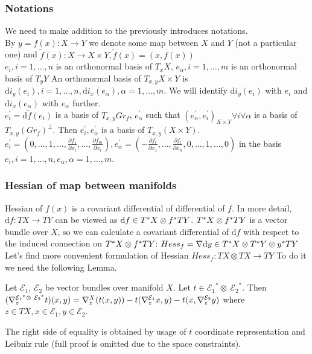 \documentclass{llncs}
\newcommand{\partderiv}[2]{\frac{\partial #1}{\partial #2}}
\newcommand{\CovariantDerivManif}[2]{\tensor*{\nabla}{^{#1}_{#2}}}
\newcommand{\CovariantDiff}{\nabla}
\newcommand{\Diff}{\mathrm{d}}
\newcommand{\TangentBundle}[1]{T{#1}}
\newcommand{\CotangentBundle}[1]{\tensor*{T}{^{*}}{#1}}
\newcommand {\Preimage}[2]{{#2}^*{#1}}
\newcommand \TPreimage[2]{\Preimage{\TangentBundle{#1}}{#2}}
\newcommand {\DiffSpace}[3]{\CotangentBundle{#1}\otimes \TPreimage{#2}{#3}}
\newcommand {\HessianSpace}[3]{\CotangentBundle{#1}\otimes \CotangentBundle{#2}\otimes \TPreimage{#2}{#3}}
\newcommand {\bigeps}{\mathcal{E}}
\begin{document}
\subsubsection{Notations}
We need to make addition to the previously introduces notations.
\\
By $y = f(x):X\to Y$ we denote some map between $X$ and $Y$ (not a particular one) and $\tilde{f}(x):X \to X\times Y, \tilde{f}(x)=(x,f(x))$
\\
${e_i, i=1, …,n}$ is an orthonormal basis of $T_x X$, ${e_\alpha, i=1, …,m}$ is an orthonormal basis of $T_y Y$
An orthonormal basis of $T_{x,y} X\times Y$ is ${\Diff i_y(e_i), i=1,\dots,n, \Diff i_x(e_\alpha),\alpha=1,\dots,m}$. We will identify $\Diff i_y(e_i)$ with $e_i$ and $\Diff i_x(e_\alpha)$ with $e_\alpha$ further. 
\\
$e_i^{'}=\Diff \tilde{f}(e_i)$ is a basis of $T_{x, y} Gr_f$, 
$e_\alpha^{'}$ such that $(e_\alpha^{'},e_i^{'})_{X\times Y} \forall i \forall \alpha$ is a basis of $T_{x, y} (Gr_f)^{\bot}$. Then $e_i^{'}, e_\alpha^{'}$ is a basis of $T_{x,y}(X\times Y)$. $e_i^{'} = (0,\dots,1, \dots, \partderiv{f_1}{x_i}, \dots, \partderiv{f_m}{x_i}), 
e_{\alpha}^{'}=(-\partderiv{f_i}{x_1}, \dots, \partderiv{f_i}{x_n}, 0,\dots,1, \dots,0)$ in the basis ${e_i, i=1,\dots,n, e_\alpha,\alpha=1,\dots,m}$.

\subsubsection{Hessian of map between manifolds}
Hessian of $f(x)$ is a covariant differential of differential of $f$. In more detail, $\Diff f:TX\to TY$ can be viewed as $\Diff f \in \DiffSpace{X}{Y}{f}$.
$\DiffSpace{X}{Y}{f}$ is a vector bundle over $X$, so we can calculate a covariant differential of $\Diff f$ with respect to the induced connection on $\DiffSpace{X}{Y}{f}$: $Hess_f=\CovariantDiff \Diff y \in \HessianSpace{X}{Y}{y}$
\\
Let's find more convenient formulation of Hessian $Hess_f:\TangentBundle{X}\otimes\TangentBundle{X}\to \TangentBundle{Y}$
To do it we need the following Lemma.
\begin{lemma} \label{LemCovDiff}
Let $\bigeps_1$, $\bigeps_2$ be vector bundles over manifold $X$. 
Let $t \in {\bigeps_1}^* \otimes \ {\bigeps_2}^*$. Then
$(\CovariantDerivManif{{\bigeps_1}^* \otimes \ {\bigeps_2}^*}{z}{t})(x, y) = 
\CovariantDerivManif{X}{z}{(t(x, y))} -
t(\CovariantDerivManif{\bigeps_1}{z}{x}, y) - 
t(x, \CovariantDerivManif{\bigeps_2}{z}{y})$
where $z \in TX, x \in \bigeps_1, y \in \bigeps_2$. 
\end{lemma}
The right side of equality is obtained by usage of $t$ coordinate representation and Leibniz rule (full proof is omitted due to the space constraints).
\end{document}
